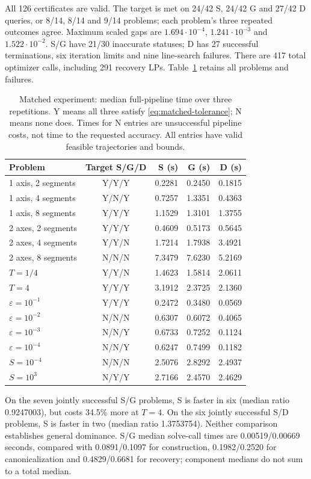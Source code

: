 \documentclass[pdflatex,sn-mathphys-num]{sn-jnl}
\theoremstyle{thmstyleone}
\theoremstyle{thmstyletwo}\newtheorem{remark}[theorem]{Remark}
\begin{document}
All 126 certificates are valid. The target is met on 24/42 S, 24/42 G
and 27/42 D queries, or 8/14, 8/14 and 9/14 problems; each problem's
three repeated outcomes agree. Maximum scaled gaps are
$1.694\cdot10^{-4}$, $1.241\cdot10^{-3}$ and $1.522\cdot10^{-2}$.
S/G have 21/30 inaccurate statuses; D has 27 successful terminations,
six iteration limits and nine line-search failures. There are 417 total
optimizer calls, including 291 recovery LPs. Table~\ref{tab:matched}
retains all problems and failures.
\begin{table}[ht]
\centering\small
\caption{Matched experiment: median full-pipeline time over three repetitions.
Y means all three satisfy \eqref{eq:matched-tolerance}; N means none does.
Times for N entries are unsuccessful pipeline costs, not time to the requested
accuracy. All entries have valid feasible trajectories and bounds.}
\label{tab:matched}
\begin{tabular}{@{}lcrrr@{}}
\toprule
Problem & Target S/G/D & S (s) & G (s) & D (s)\\
\midrule
1 axis, 2 segments & Y/Y/Y & 0.2281 & 0.2450 & 0.1815\\
1 axis, 4 segments & Y/N/Y & 0.7257 & 1.3351 & 0.4363\\
1 axis, 8 segments & Y/Y/Y & 1.1529 & 1.3101 & 1.3755\\
2 axes, 2 segments & Y/Y/Y & 0.4609 & 0.5173 & 0.5645\\
2 axes, 4 segments & Y/Y/N & 1.7214 & 1.7938 & 3.4921\\
2 axes, 8 segments & N/N/N & 7.3479 & 7.6230 & 5.2169\\
$T=1/4$ & Y/Y/N & 1.4623 & 1.5814 & 2.0611\\
$T=4$ & Y/Y/Y & 3.1912 & 2.3725 & 2.1360\\
$\varepsilon=10^{-1}$ & Y/Y/Y & 0.2472 & 0.3480 & 0.0569\\
$\varepsilon=10^{-2}$ & N/N/N & 0.6307 & 0.6072 & 0.4065\\
$\varepsilon=10^{-3}$ & N/N/Y & 0.6733 & 0.7252 & 0.1124\\
$\varepsilon=10^{-4}$ & N/N/Y & 0.6247 & 0.7499 & 0.1182\\
$S=10^{-4}$ & N/N/N & 2.5076 & 2.8292 & 2.4937\\
$S=10^3$ & N/Y/Y & 2.7166 & 2.4570 & 2.4629\\
\bottomrule
\end{tabular}
\end{table}

On the seven jointly successful S/G problems, S is faster in six
(median ratio 0.9247003), but costs 34.5\% more at $T=4$.
On the six jointly successful S/D problems, S is faster in two
(median ratio 1.3753754). Neither comparison establishes general dominance.
S/G median solve-call times are 0.00519/0.00669 seconds, compared with
0.0891/0.1097 for construction, 0.1982/0.2520 for canonicalization and
0.4829/0.6681 for recovery; component medians do not sum to a total median.
\end{document}
